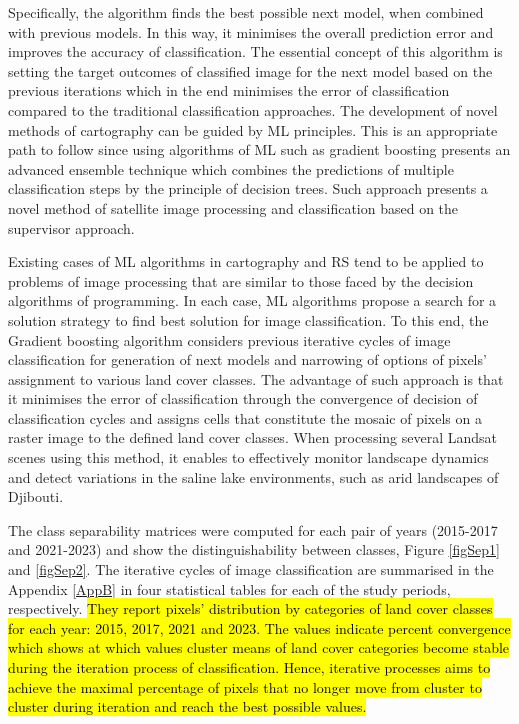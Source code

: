 \documentclass[jimaging,article,submit,pdftex,moreauthors]{Definitions/mdpi}
\begin{document}
Specifically, the algorithm finds the best possible next model, when combined with previous models. In this way, it minimises the overall prediction error and improves the accuracy of classification. The essential concept of this algorithm is setting the target outcomes of classified image for the next model based on the previous iterations which in the end minimises the error of classification compared to the traditional classification approaches. The development of novel methods of cartography can be guided by ML principles. This is an appropriate path to follow since using algorithms of ML such as gradient boosting presents an advanced ensemble technique which combines the predictions of multiple classification steps by the principle of decision trees. Such approach presents a novel method of satellite image processing and classification based on the supervisor approach. 

Existing cases of ML algorithms in cartography and RS tend to be applied to problems of image processing that are similar to those faced by the decision algorithms of programming. In each case, ML algorithms propose a search for a solution strategy to find best solution for image classification. To this end,\hl{ }the Gradient boosting algorithm considers previous iterative cycles of image classification for generation of next models and narrowing of options of pixels' assignment to various land cover classes. The advantage of such approach is that it minimises the error of classification through the convergence of decision of classification cycles and assigns cells that constitute the mosaic of pixels on a raster image to the defined land cover classes. When processing several Landsat scenes using this method, it enables to effectively monitor landscape dynamics and detect variations in the saline lake environments, such as arid landscapes of Djibouti. 

The class separability matrices were computed for each pair of years (2015-2017 and 2021-2023) and show the distinguishability between classes, Figure \ref{figSep1} and \ref{figSep2}. The iterative cycles of image classification are summarised in the Appendix \ref{AppB} in four statistical tables for each of the study periods, respectively. \hl{They report pixels' distribution by categories of land cover classes for each year: 2015, 2017, 2021 and 2023. The values indicate percent convergence which shows at which values cluster means of land cover categories become stable during the iteration process of classification. Hence, iterative processes aims to achieve the maximal percentage of pixels that no longer move from cluster to cluster during iteration and reach the best possible values.} 
\end{document}
